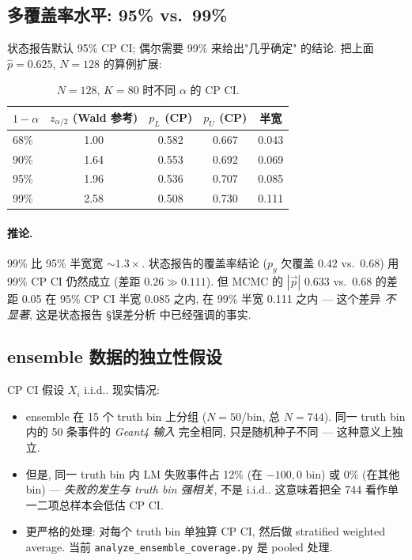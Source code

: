 \subsection{多覆盖率水平: 95\% vs.\ 99\%}
\label{sec:partIII:coverage_methodology:multilevel}

状态报告默认 95\% CP CI; 偶尔需要 99\% 来给出"几乎确定" 的结论. 把上面 $\hat p = 0.625$, $N=128$ 的算例扩展:

\begin{table}[H]
\centering\small
\caption{$N=128$, $K=80$ 时不同 $\alpha$ 的 CP CI.}
\label{tab:partIII:cp_multilevel}
\begin{tabular}{lcccc}
\toprule
$1 - \alpha$ & $z_{\alpha/2}$ (Wald 参考) & $p_L$ (CP) & $p_U$ (CP) & 半宽 \\
\midrule
68\% & 1.00 & 0.582 & 0.667 & 0.043 \\
90\% & 1.64 & 0.553 & 0.692 & 0.069 \\
95\% & 1.96 & 0.536 & 0.707 & 0.085 \\
99\% & 2.58 & 0.508 & 0.730 & 0.111 \\
\bottomrule
\end{tabular}
\end{table}

\paragraph{推论.} 99\% 比 95\% 半宽宽 $\sim 1.3\times$. 状态报告的覆盖率结论 ($p_y$ 欠覆盖 $0.42$ vs.\ $0.68$) 用 99\% CP CI 仍然成立 (差距 $0.26 \gg 0.111$). 但 MCMC 的 $|\vec p|$ 0.633 vs.\ 0.68 的差距 0.05 在 95\% CP CI 半宽 0.085 之内, 在 99\% 半宽 0.111 之内 — 这个差异 \emph{不显著}, 这是状态报告 §误差分析 中已经强调的事实.

\subsection{ensemble 数据的独立性假设}
\label{sec:partIII:coverage_methodology:independence}

CP CI 假设 $X_i$ i.i.d.. 现实情况:
\begin{itemize}[nosep]
  \item ensemble 在 15 个 truth bin 上分组 ($N=50$/bin, 总 $N=744$). 同一 truth bin 内的 50 条事件的 \emph{Geant4 输入} 完全相同, 只是随机种子不同 — 这种意义上独立.
  \item 但是, 同一 truth bin 内 LM 失败事件占 12\% (在 $-100, 0$ bin) 或 $0$\% (在其他 bin) — \emph{失败的发生与 truth bin 强相关}, 不是 i.i.d.. 这意味着把全 744 看作单一二项总样本会低估 CP CI.
  \item 更严格的处理: 对每个 truth bin 单独算 CP CI, 然后做 stratified weighted average. 当前 \texttt{analyze\_ensemble\_coverage.py} 是 pooled 处理.
\end{itemize}

